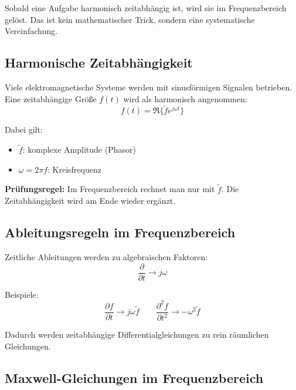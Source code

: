 \documentclass[a4paper]{article}
\newcommand{\imp}[1]{{\color{accent}\bfseries #1}}
\begin{document}
\begin{merke}
Sobald eine Aufgabe harmonisch zeitabhängig ist, wird sie im Frequenzbereich gelöst.
Das ist kein mathematischer Trick, sondern eine systematische Vereinfachung.
\end{merke}

\subsection{Harmonische Zeitabhängigkeit}

Viele elektromagnetische Systeme werden mit sinusförmigen Signalen betrieben.
Eine zeitabhängige Größe $f(t)$ wird als harmonisch angenommen:
\[
f(t)=\Re\{\tilde f e^{j\omega t}\}
\]

Dabei gilt:
\begin{itemize}
  \item $\tilde f$: komplexe Amplitude (Phasor)
  \item $\omega=2\pi f$: Kreisfrequenz
\end{itemize}

\begin{schema}
\imp{Prüfungsregel:}
Im Frequenzbereich rechnet man nur mit $\tilde f$.
Die Zeitabhängigkeit wird am Ende wieder ergänzt.
\end{schema}

\subsection{Ableitungsregeln im Frequenzbereich}

Zeitliche Ableitungen werden zu algebraischen Faktoren:
\[
\frac{\partial}{\partial t} \rightarrow j\omega
\]

Beispiele:
\[
\frac{\partial f}{\partial t}
\rightarrow j\omega \tilde f
\qquad
\frac{\partial^2 f}{\partial t^2}
\rightarrow -\omega^2 \tilde f
\]

\begin{merke}
Dadurch werden zeitabhängige Differentialgleichungen zu rein räumlichen Gleichungen.
\end{merke}

\subsection{Maxwell-Gleichungen im Frequenzbereich}
\end{document}
